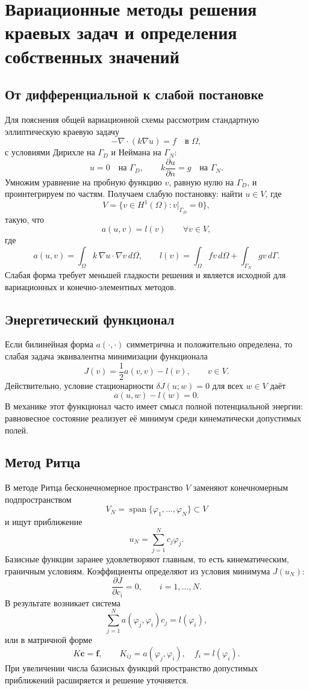 \section{Вариационные методы решения краевых задач и определения собственных значений}
\label{sec:variational-bvp-eigen}

\subsection{От дифференциальной к слабой постановке}

Для пояснения общей вариационной схемы рассмотрим стандартную эллиптическую краевую задачу
\[
    -\nabla\!\cdot\!(k\nabla u)=f\quad\text{в }\Omega,
\]
с условиями Дирихле на $\Gamma_D$ и Неймана на $\Gamma_N$:
\[
    u=0\quad\text{на }\Gamma_D,
    \qquad
    k\frac{\partial u}{\partial n}=g\quad\text{на }\Gamma_N.
\]
Умножим уравнение на пробную функцию $v$, равную нулю на $\Gamma_D$, и
проинтегрируем по частям. Получаем слабую постановку: найти $u\in V$, где
\[
    V=\{v\in H^1(\Omega):v|_{\Gamma_D}=0\},
\]
такую, что
\[
    a(u,v)=l(v)\qquad \forall v\in V,
\]
где
\[
    a(u,v)=\int_{\Omega}k\,\nabla u\cdot\nabla v\,d\Omega,
    \qquad
    l(v)=\int_{\Omega}fv\,d\Omega+
         \int_{\Gamma_N}gv\,d\Gamma.
\]
Слабая форма требует меньшей гладкости решения и является исходной для
вариационных и конечно-элементных методов.

\subsection{Энергетический функционал}

Если билинейная форма $a(\cdot,\cdot)$ симметрична и положительно определена,
то слабая задача эквивалентна минимизации функционала
\[
    J(v)=\frac12a(v,v)-l(v),
    \qquad v\in V.
\]
Действительно, условие стационарности $\delta J(u;w)=0$ для всех $w\in V$
даёт
\[
    a(u,w)-l(w)=0.
\]
В механике этот функционал часто имеет смысл полной потенциальной энергии:
равновесное состояние реализует её минимум среди кинематически допустимых
полей.

\subsection{Метод Ритца}

В методе Ритца бесконечномерное пространство $V$ заменяют конечномерным
подпространством
\[
    V_N=\operatorname{span}\{\varphi_1,\ldots,\varphi_N\}\subset V
\]
и ищут приближение
\[
    u_N=\sum_{j=1}^{N}c_j\varphi_j.
\]
Базисные функции заранее удовлетворяют главным, то есть кинематическим,
граничным условиям. Коэффициенты определяют из условия минимума
$J(u_N)$:
\[
    \frac{\partial J}{\partial c_i}=0,
    \qquad i=1,\ldots,N.
\]
В результате возникает система
\[
    \sum_{j=1}^{N}a(\varphi_j,\varphi_i)c_j=l(\varphi_i),
\]
или в матричной форме
\[
    K\mathbf c=\mathbf f,
    \qquad
    K_{ij}=a(\varphi_j,\varphi_i),
    \quad f_i=l(\varphi_i).
\]
При увеличении числа базисных функций пространство допустимых приближений
расширяется и решение уточняется.

